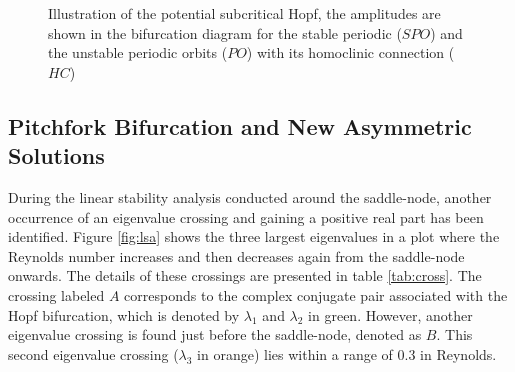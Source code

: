 \begin{figure}[h!]
\vspace{20pt}
\centering
{}
\caption{Illustration of the potential subcritical Hopf, the amplitudes are
shown in the bifurcation diagram for the stable periodic ($SPO$) and the
unstable periodic orbits ($PO$) with its homoclinic connection ($HC$)} 
\label{fig:sub_hopf_sketch}
\end{figure}

\subsection{Pitchfork Bifurcation and New Asymmetric Solutions}

During the linear stability analysis conducted around the saddle-node, another
occurrence of an eigenvalue crossing and gaining a positive real part has been
identified. Figure \ref{fig:lsa} shows the three largest eigenvalues in a plot
where the Reynolds number increases and then decreases again from the
saddle-node onwards. The details of these crossings are presented in table
\ref{tab:cross}. The crossing labeled $A$ corresponds to the complex conjugate
pair associated with the Hopf bifurcation, which is denoted by $\lambda_1$ and
$\lambda_2$ in green. However, another eigenvalue crossing is found just before
the saddle-node, denoted as $B$. This second eigenvalue crossing ($\lambda_3$
in orange) lies within a range of $0.3$ in Reynolds. \\\\

